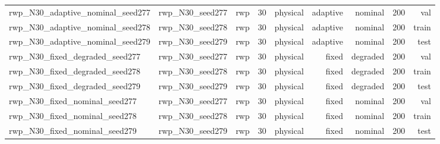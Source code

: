 \begin{tabular}{lrrrrrrrr}
rwp\_N30\_adaptive\_nominal\_seed277 & rwp\_N30\_seed277 & rwp & 30 & physical & adaptive & nominal & 200 & val \\
rwp\_N30\_adaptive\_nominal\_seed278 & rwp\_N30\_seed278 & rwp & 30 & physical & adaptive & nominal & 200 & train \\
rwp\_N30\_adaptive\_nominal\_seed279 & rwp\_N30\_seed279 & rwp & 30 & physical & adaptive & nominal & 200 & test \\
rwp\_N30\_fixed\_degraded\_seed277 & rwp\_N30\_seed277 & rwp & 30 & physical & fixed & degraded & 200 & val \\
rwp\_N30\_fixed\_degraded\_seed278 & rwp\_N30\_seed278 & rwp & 30 & physical & fixed & degraded & 200 & train \\
rwp\_N30\_fixed\_degraded\_seed279 & rwp\_N30\_seed279 & rwp & 30 & physical & fixed & degraded & 200 & test \\
rwp\_N30\_fixed\_nominal\_seed277 & rwp\_N30\_seed277 & rwp & 30 & physical & fixed & nominal & 200 & val \\
rwp\_N30\_fixed\_nominal\_seed278 & rwp\_N30\_seed278 & rwp & 30 & physical & fixed & nominal & 200 & train \\
rwp\_N30\_fixed\_nominal\_seed279 & rwp\_N30\_seed279 & rwp & 30 & physical & fixed & nominal & 200 & test \\
\bottomrule
\end{tabular}